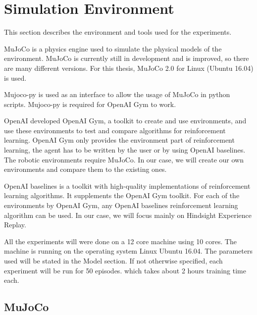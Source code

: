 \chapter{Simulation Environment}

This section describes the environment and tools used for the experiments.

MuJoCo is a physics engine used to simulate the physical models of the environment. MuJoCo is currently still in development and is improved, so there are many different versions. For this thesis, MuJoCo 2.0 for Linux (Ubuntu 16.04) is used. 

\vspace{0.5cm}

Mujoco-py is used as an interface to allow the usage of MuJoCo in python scripts. Mujoco-py is required for OpenAI Gym to work.

\vspace{0.5cm}

OpenAI developed OpenAI Gym, a toolkit to create and use environments, and use these environments to test and compare algorithms for reinforcement learning. OpenAI Gym only provides the environment part of reinforcement learning, the agent has to be written by the user or by using OpenAI baselines. The robotic environments require MuJoCo. In our case, we will create our own environments and compare them to the existing ones.

\vspace{0.5cm}

OpenAI baselines is a toolkit with high-quality implementations of reinforcement learning algorithms. It supplements the OpenAI Gym toolkit. For each of the environments by OpenAI Gym, any OpenAI baselines reinforcement learning algorithm can be used. In our case, we will focus mainly on Hindsight Experience Replay.

\vspace{0.5cm}

All the experiments will were done on a 12 core machine using 10 cores. The machine is running on the operating system Linux Ubuntu 16.04. The parameters used will be stated in the Model section. If not otherwise specified, each experiment will be run for 50 episodes. which takes about 2 hours training time each.


\section{MuJoCo}

